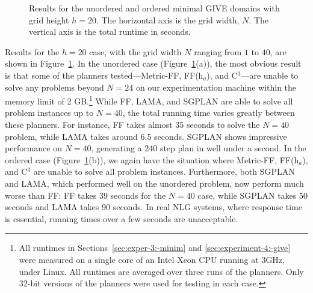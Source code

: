 \begin{figure}[t]
  \caption{Results for the unordered and ordered minimal GIVE domains with grid
  height $h=20$. The horizontal axis is the grid width, $N$. 
  The vertical axis is the total runtime in seconds.}
  \label{fig:give-minimal}
\end{figure}

Results for the $h=20$ case, with the grid width $N$ ranging from $1$ to $40$,
are shown in Figure~\ref{fig:give-minimal}. In the unordered case
(Figure~\ref{fig:give-minimal}(a)), the most obvious result is that some of the
planners tested---Metric-FF, FF(h$_a$), and C$^3$---are unable to solve any
problems beyond $N=24$ on our experimentation machine within the memory limit of
2 GB.\footnote{All runtimes in Sections~\ref{sec:exper-3:-minim} and
 \ref{sec:experiment-4:-give} were measured on a single core of an Intel Xeon
 CPU running at 3GHz, under Linux. All runtimes are averaged over three runs of
 the planners. Only 32-bit versions of the planners were used for testing in
 each case.}
While FF, LAMA, and SGPLAN are able to solve all problem instances up to $N=40$,
the total running time varies greatly between these planners. For instance, FF
takes almost 35 seconds to solve the $N=40$ problem, while LAMA takes around 6.5
seconds. SGPLAN shows impressive performance on $N=40$, generating a 240 step
plan in well under a second. In the ordered case
(Figure~\ref{fig:give-minimal}(b)), we again have the situation where Metric-FF,
FF(h$_a$), and C$^3$ are unable to solve all problem instances. Furthermore,
both SGPLAN and LAMA, which performed well on the unordered problem, now perform
much worse than FF: FF takes 39 seconds for the $N=40$ case, while SGPLAN takes
50 seconds and LAMA takes 90 seconds. In real NLG systems, where response time
is essential, running times over a few seconds are unacceptable.

